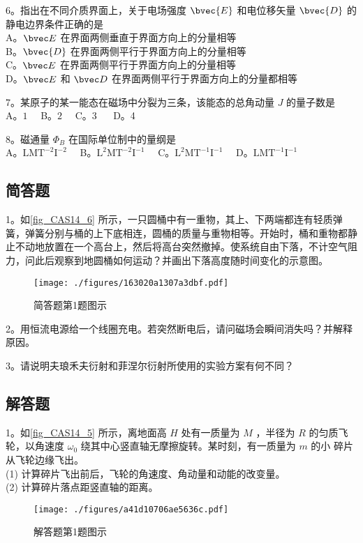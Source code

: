 6。指出在不同介质界面上，关于电场强度 $\bvec{E}$ 和电位移矢量 $\bvec{D}$ 的静电边界条件正确的是\\
A。$\bvec E$ 在界面两侧垂直于界面方向上的分量相等\\
B。$\bvec{D}$ 在界面两侧平行于界面方向上的分量相等\\
C。$\bvec E$ 在界面两侧平行于界面方向上的分量相等\\
D。$\bvec E$ 和 $\bvec D$ 在界面两侧平行于界面方向上的分量都相等

7。某原子的某一能态在磁场中分裂为三条，该能态的总角动量 $J$ 的量子数是\\
A。$1\quad $ B。$2 \quad$ C。3 $\quad$ D。4

8。磁通量 $\Phi_B$ 在国际单位制中的量纲是\\
A。$\mathrm{LMT^{-2}I^{-2}}\quad$ B。$\mathrm{L^{2}MT^{-2}I^{-1}}\quad$ C。$\mathrm{L^{2}MT^{-1}I^{-1}}\quad$ D。$\mathrm{LMT^{-1}I^{-1}}$

\subsection{简答题}
1。如\autoref{fig_CAS14_6} 所示，一只圆桶中有一重物，其上、下两端都连有轻质弹簧，弹簧分别与桶的上下底相连，圆桶的质量与重物相等。开始时，桶和重物都静止不动地放置在一个高台上，然后将高台突然撤掉。使系统自由下落，不计空气阻力，问此后观察到地圆桶如何运动？并画出下落高度随时间变化的示意图。
\begin{figure}[ht]
\centering
\texttt{[image: ./figures/163020a1307a3dbf.pdf]}
\caption{简答题第1题图示} \label{fig_CAS14_6}
\end{figure}

2。用恒流电源给一个线圈充电。若突然断电后，请问磁场会瞬间消失吗？并解释原因。


3。请说明夫琅禾夫衍射和菲涅尔衍射所使用的实验方案有何不同？


\subsection{解答题}
1。如\autoref{fig_CAS14_5} 所示，离地面高 $H$ 处有一质量为 $M$ ，半径为 $R$ 的匀质飞轮，以角速度 $\omega_0$ 绕其中心竖直轴无摩擦旋转。某时刻，有一质量为 $m$ 的小 碎片从飞轮边缘飞出。\\
(1) 计算碎片飞出前后，飞轮的角速度、角动量和动能的改变量。\\
(2) 计算碎片落点距竖直轴的距离。
\begin{figure}[ht]
\centering
\texttt{[image: ./figures/a41d10706ae5636c.pdf]}
\caption{解答题第1题图示} \label{fig_CAS14_5}
\end{figure}

